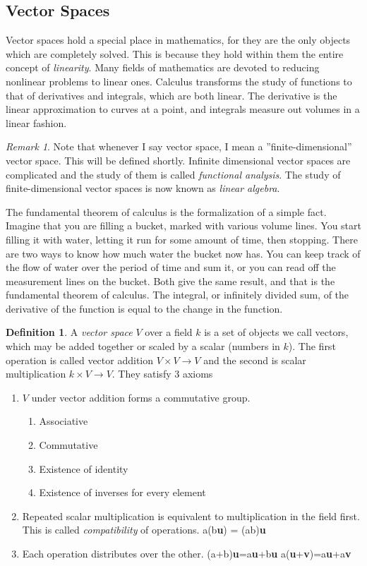 \documentclass[12pt]{article}
\theoremstyle{definition}
\newtheorem{definition}{Definition}[section]
\theoremstyle{remark}
\newtheorem*{remark}{Remark}
\theoremstyle{example}
\def\b#1{\textbf{#1}}
\begin{document}
\subsection{Vector Spaces}

Vector spaces hold a special place in mathematics, for they are the only objects which are completely solved. This is because they hold within them the entire concept of \textit{linearity}. Many fields of mathematics are devoted to reducing nonlinear problems to linear ones. Calculus transforms the study of functions to that of derivatives and integrals, which are both linear. The derivative is the linear approximation to curves at a point, and integrals measure out volumes in a linear fashion.

\begin{remark}
	Note that whenever I say vector space, I mean a ''finite-dimensional'' vector space. This will be defined shortly. Infinite dimensional vector spaces are complicated and the study of them is called \textit{functional analysis}. The study of finite-dimensional vector spaces is now known as \textit{linear algebra}.
\end{remark}

The fundamental theorem of calculus is the formalization of a simple fact. Imagine that you are filling a bucket, marked with various volume lines. You start filling it with water, letting it run for some amount of time, then stopping. There are two ways to know how much water the bucket now has. You can keep track of the flow of water over the period of time and sum it, or you can read off the measurement lines on the bucket. Both give the same result, and that is the fundamental theorem of calculus. The integral, or infinitely divided sum, of the derivative of the function is equal to the change in the function.


\begin{definition}
	A \textit{vector space} $V$ over a field $k$ is a set of objects we call vectors, which may be added together or scaled by a scalar (numbers in $k$). The first operation is called vector addition $V\times V\to V$ and the second is scalar multiplication $k\times V\to V$. They satisfy 3 axioms
	
	\begin{enumerate}
		\item $V$ under vector addition forms a commutative group.
		\begin{enumerate}
			\item Associative
			\item Commutative
			\item Existence of identity
			\item Existence of inverses for every element
		\end{enumerate}
		\item Repeated scalar multiplication is equivalent to multiplication in the field first. This is called \textit{compatibility} of operations.
		\subitem a(b\b{u}) = (ab)\b{u}
		\item Each operation distributes over the other.
		\subitem (a+b)\b{u}=a\b{u}+b\b{u}
		\subitem a(\b{u}+\b{v})=a\b{u}+a\b{v}
	\end{enumerate}
\end{definition}
\end{document}
